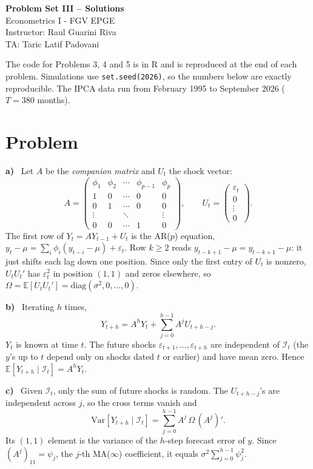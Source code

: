 \documentclass[11pt]{article}
\newcommand{\E}{\mathbb{E}}
\newcommand{\Var}{\mathrm{Var}}
\newcounter{problem}
\renewcommand{\theproblem}{\arabic{problem}}
\newcommand{\problem}{
	\stepcounter{problem}
	\section*{Problem \theproblem}
}
\newcommand{\itm}[1]{\par\textbf{#1)}\ }
\begin{document}
	\begin{center}
		{\LARGE{\textbf{Problem Set III -- Solutions}}}\\
		\vspace{0.2cm}
		Econometrics I - \textcolor{FGVBlue}{FGV EPGE}\\
		Instructor: Raul Guarini Riva \\
		TA: Taric Latif Padovani
	\end{center}

The code for Problems 3, 4 and 5 is in R and is reproduced at the end of each problem. Simulations use \texttt{set.seed(2026)}, so the numbers below are exactly reproducible. The IPCA data run from February 1995 to September 2026 ($T=380$ months).

\problem

\itm{a}
Let $A$ be the \emph{companion matrix} and $U_t$ the shock vector:
\[
A=\begin{pmatrix}
\phi_1&\phi_2&\cdots&\phi_{p-1}&\phi_p\\
1&0&\cdots&0&0\\
0&1&\cdots&0&0\\
\vdots&&\ddots&&\vdots\\
0&0&\cdots&1&0
\end{pmatrix},\qquad
U_t=\begin{pmatrix}\varepsilon_t\\0\\\vdots\\0\end{pmatrix}.
\]
The first row of $Y_t=AY_{t-1}+U_t$ is the AR($p$) equation, $y_t-\mu=\sum_i\phi_i(y_{t-i}-\mu)+\varepsilon_t$. Row $k\ge2$ reads $y_{t-k+1}-\mu=y_{t-k+1}-\mu$: it just shifts each lag down one position. Since only the first entry of $U_t$ is nonzero, $U_tU_t'$ has $\varepsilon_t^2$ in position $(1,1)$ and zeros elsewhere, so $\Omega=\E[U_tU_t']=\mathrm{diag}(\sigma^2,0,\dots,0)$.

\itm{b}
Iterating $h$ times,
\[
Y_{t+h}=A^hY_t+\sum_{j=0}^{h-1}A^jU_{t+h-j}.
\]
$Y_t$ is known at time $t$. The future shocks $\varepsilon_{t+1},\dots,\varepsilon_{t+h}$ are independent of $\mathcal I_t$ (the $y$'s up to $t$ depend only on shocks dated $t$ or earlier) and have mean zero. Hence $\E[Y_{t+h}\mid\mathcal I_t]=A^hY_t$.

\itm{c}
Given $\mathcal I_t$, only the sum of future shocks is random. The $U_{t+h-j}$'s are independent across $j$, so the cross terms vanish and
\[
\Var[Y_{t+h}\mid\mathcal I_t]=\sum_{j=0}^{h-1}A^j\,\Omega\,(A^j)' .
\]
Its $(1,1)$ element is the variance of the $h$-step forecast error of $y$. Since $(A^j)_{11}=\psi_j$, the $j$-th MA($\infty$) coefficient, it equals $\sigma^2\sum_{j=0}^{h-1}\psi_j^2$.
\end{document}
